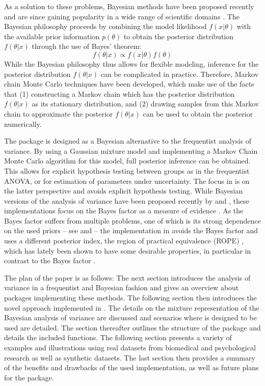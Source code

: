 As a solution to these problems, Bayesian methods have been proposed recently and are since gaining popularity in a wide range of scientific domains \citep{McElreath2015, Kruschke2013, Kruschke2015}. The Bayesian philosophy proceeds by combining the model likelihood $f(x|\theta)$ with the available prior information $p(\theta)$ to obtain the posterior distribution $f(\theta|x)$ through the use of Bayes' theorem:
\begin{equation} \label{eq:mean}
f(\theta|x) \propto f(x|\theta) f(\theta)
\end{equation}
While the Bayesian philosophy thus allows for flexible modeling, inference for the posterior distribution $f(\theta|x)$ can be complicated in practice. Therefore, Markov chain Monte Carlo techniques have been developed, which make use of the facts that (1) constructing a Markov chain which has the posterior distribution $f(\theta|x)$ as its stationary distribution, and (2) drawing samples from this Markov chain to approximate the posterior $f(\theta|x)$ can be used to obtain the posterior numerically.

The  package is designed as a Bayesian alternative to the frequentist analysis of variance. By using a Gaussian mixture model and implementing a Markov Chain Monte Carlo algorithm for this model, full posterior inference can be obtained. This allows for explicit hypothesis testing between groups as in the frequentist ANOVA, or for estimation of parameters under uncertainty. The focus in  is on the latter perspective and avoids explicit hypothesis testing. While Bayesian versions of the analysis of variance have been proposed recently by \cite{Rouder2012} and \cite{Bergh2019ANOVAJasp}, these implementations focus on the Bayes factor as a measure of evidence \citep{VanDoorn2019, Jasp2019}. As the Bayes factor suffers from multiple problems, one of which is its strong dependence on the used priors -- see \cite{Kamary2014} and \cite{Robert2016} -- the implementation in  avoids the Bayes factor and uses a different posterior index, the region of practical equivalence (ROPE) \citep{Kruschke2018a}, which has lately been shown to have some desirable properties, in particular in contrast to the Bayes factor \citep{Makowski2019}. 

The plan of the paper is as follows: The next section introduces the analysis of variance in a frequentist and Bayesian fashion and gives an overview about packages implementing these methods. The following section then introduces the novel approach implemented in . The details on the mixture representation of the Bayesian analysis of variance are discussed and scenarios where  is designed to be used are detailed. The section thereafter outlines the structure of the package and details the included functions. The following section presents a variety of examples and illustrations using real datasets from biomedical and psychological research as well as synthetic datasets. The last section then provides a summary of the benefits and drawbacks of the used implementation, as well as future plans for the package.


